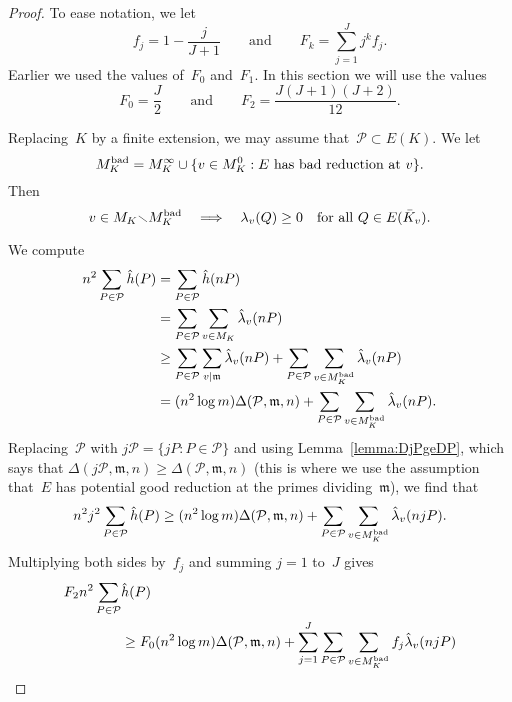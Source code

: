 \begin{proof}
To ease notation, we let
\[
  f_j = 1-\frac{j}{J+1}
  \qquad\text{and}\qquad
  F_k = \sum_{j=1}^J j^kf_j.
\]
Earlier we used the values of~$F_0$ and~$F_1$. In this section we will
use the values
\begin{equation}
  \label{eqn:F0F1F2}
  F_0 = \frac{J}{2}
  \qquad\text{and}\qquad
  F_2 = \frac{J(J+1)(J+2)}{12}.
\end{equation}
\par
Replacing~$K$ by a finite extension, we may assume that~${{\mathcal P}}\subset
E(K)$.  We let
\[
  M_K^{{\textup{bad}}} = M_K^\infty \cup \{v\in M_K^0 : 
   \text{$E$ has bad reduction at $v$}\} .
\]
Then
\[
  v\in M_K{\smallsetminus} M_K^{{\textup{bad}}}
  \quad\Longrightarrow\quad
  {\lambda}_v(Q)\ge0\quad\text{for all $Q\in E({{\bar K}}_v)$.}
\]
\par
We compute
\begin{align*}
  n^2\sum_{P\in{{\mathcal P}}} {{\hat h}}(P)
  & = \sum_{P\in{{\mathcal P}}} {{\hat h}}(nP) \\
  & = \sum_{P\in{{\mathcal P}}} \sum_{v\in M_K} {\hat\lambda}_v(nP) \\
  &\ge \sum_{P\in{{\mathcal P}}} \sum_{v\mid{{\mathfrak{m}}}} {\hat\lambda}_v(nP) 
       + \sum_{P\in{{\mathcal P}}} \sum_{v\in M_K^{{\textup{bad}}}} {\hat\lambda}_v(nP) \\
  &= (n^2\log m){\Delta}({{\mathcal P}},{{\mathfrak{m}}},n)
       + \sum_{P\in{{\mathcal P}}} \sum_{v\in M_K^{{\textup{bad}}}} {\hat\lambda}_v(nP).
\end{align*}
Replacing~${{\mathcal P}}$ with $j{{\mathcal P}}=\{jP:P\in{{\mathcal P}}\}$ and using
Lemma~\ref{lemma:DjPgeDP}, which says that
${\Delta}(j{{\mathcal P}},{{\mathfrak{m}}},n)\ge{\Delta}({{\mathcal P}},{{\mathfrak{m}}},n)$ (this is where we use the
assumption that~$E$ has potential good reduction at the primes
dividing~${{\mathfrak{m}}}$), we find that
\[
  n^2j^2\sum_{P\in{{\mathcal P}}} {{\hat h}}(P)
  \ge (n^2\log m){\Delta}({{\mathcal P}},{{\mathfrak{m}}},n)
       + \sum_{P\in{{\mathcal P}}} \sum_{v\in M_K^{{\textup{bad}}}} {\hat\lambda}_v(njP).
\]
Multiplying both sides by~$f_j$ and summing $j=1$ to~$J$ gives
\begin{align*}
  F_2n^2\sum_{P\in{{\mathcal P}}}& {{\hat h}}(P)\\
  &\ge F_0(n^2\log m){\Delta}({{\mathcal P}},{{\mathfrak{m}}},n)
       + \sum_{j=1}^J \sum_{P\in{{\mathcal P}}} \sum_{v\in M_K^{{\textup{bad}}}} f_j{\hat\lambda}_v(njP) \\

\end{align*}
\end{proof}

